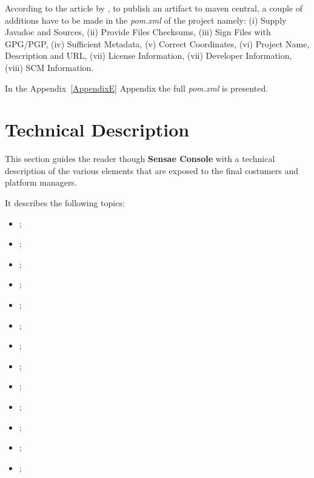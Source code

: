 According to the article  by \cite{centralreq}, to publish an artifact to maven central, a couple of additions have to be made in the \textit{pom.xml} of the project namely: (i) Supply Javadoc and Sources, (ii) Provide Files Checksums, (iii) Sign Files with GPG/PGP, (iv) Sufficient Metadata, (v) Correct Coordinates, (vi) Project Name, Description and URL, (vii) License Information, (vii) Developer Information, (viii) SCM Information.

In the Appendix~\ref{AppendixE} Appendix the full \textit{pom.xml} is presented.

\section{Technical Description}
\label{sec:implementation:description}

This section guides the reader though \textbf{Sensae Console} with a technical description of the various elements that are exposed to the final costumers and platform managers.

It describes the following topics:

\begin{itemize}
    \item {};
    \item {};
    \item {};
    \item {};
    \item {};
    \item {};
    \item {};
    \item {};
    \item {};
    \item {};
    \item {};
    \item {};
    \item {};
\end{itemize}

